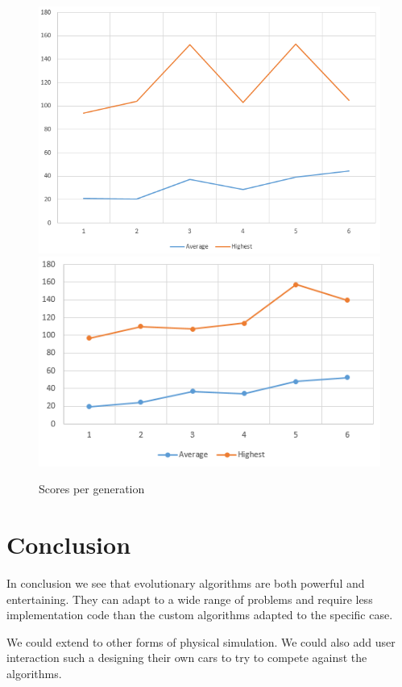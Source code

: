 \documentclass[12pt,Bold,letterpaper,TexShade]{mcgilletdclass}
\begin{document}
\begin{figure}[p]
    \centering
    \includegraphics{plot1.png}
    \includegraphics{plot2.png}
    \caption{Scores per generation}
    \label{fig:plots}
\end{figure}

\section{Conclusion}

In conclusion we see that evolutionary algorithms are both powerful and entertaining. They can adapt to a wide range of problems and require less implementation code than the custom algorithms adapted to the specific case.

We could extend to other forms of physical simulation. We could also add user interaction such a designing their own cars to try to compete against the algorithms.



\end{document}
